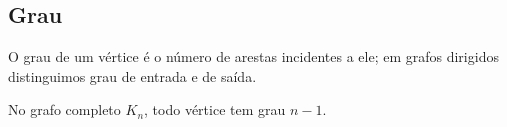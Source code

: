 \subsection{Grau}
O grau de um vértice é o número de arestas incidentes a ele; em grafos dirigidos distinguimos grau de entrada e de saída.
\begin{exemplo}
No grafo completo $K_n$, todo vértice tem grau $n-1$.
\end{exemplo}
